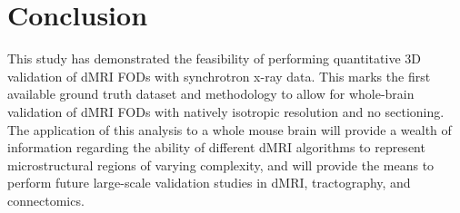 \documentclass[11pt]{article}
\begin{document}
\section{Conclusion}
This study has demonstrated the feasibility of performing quantitative 3D
validation of dMRI FODs with synchrotron x-ray data. This marks the first
available ground truth dataset and methodology to allow for whole-brain
validation of dMRI FODs with natively isotropic resolution and no sectioning. The
application of this analysis to a whole mouse brain will provide a wealth of
information regarding the ability of different dMRI algorithms to represent
microstructural regions of varying complexity, and will provide the means to
perform future large-scale validation studies in dMRI, tractography, and
connectomics.




\end{document}
